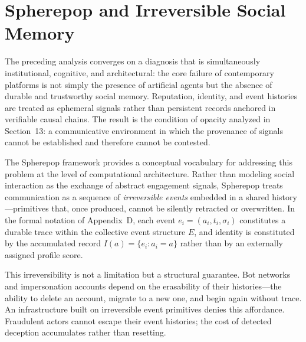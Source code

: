\documentclass[12pt,a4paper]{article}
\begin{document}
\section{Spherepop and Irreversible Social Memory}

The preceding analysis converges on a diagnosis that is simultaneously institutional,
cognitive, and architectural: the core failure of contemporary platforms is not simply the
presence of artificial agents but the absence of durable and trustworthy social memory.
Reputation, identity, and event histories are treated as ephemeral signals rather than
persistent records anchored in verifiable causal chains. The result is the condition of opacity
analyzed in Section~13: a communicative environment in which the provenance of signals cannot
be established and therefore cannot be contested.

The Spherepop framework provides a conceptual vocabulary for addressing this problem at the
level of computational architecture. Rather than modeling social interaction as the exchange
of abstract engagement signals, Spherepop treats communication as a sequence of
\emph{irreversible events} embedded in a shared history---primitives that, once produced,
cannot be silently retracted or overwritten. In the formal notation of Appendix~D, each event
$e_i = (a_i, t_i, \sigma_i)$ constitutes a durable trace within the collective event structure
$E$, and identity is constituted by the accumulated record $I(a) = \{e_i : a_i = a\}$ rather
than by an externally assigned profile score.

This irreversibility is not a limitation but a structural guarantee. Bot networks and
impersonation accounts depend on the erasability of their histories---the ability to delete an
account, migrate to a new one, and begin again without trace. An infrastructure built on
irreversible event primitives denies this affordance. Fraudulent actors cannot escape their
event histories; the cost of detected deception accumulates rather than resetting.
\end{document}
